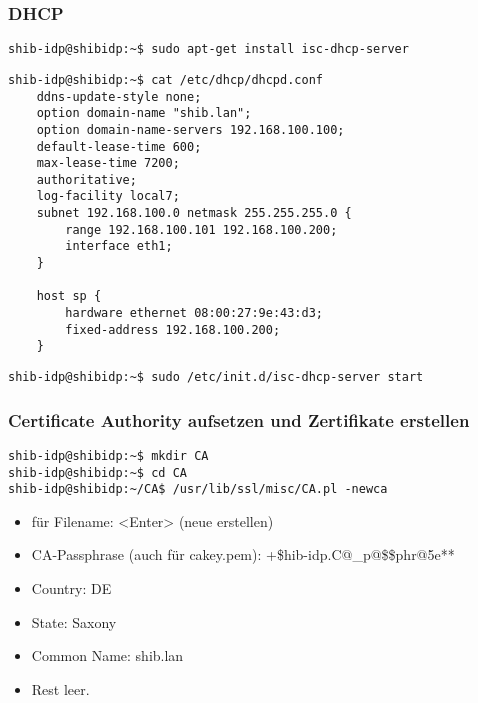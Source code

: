 \subsubsection{DHCP}
\begin{lstlisting}
shib-idp@shibidp:~$ sudo apt-get install isc-dhcp-server
\end{lstlisting}
\begin{lstlisting}
shib-idp@shibidp:~$ cat /etc/dhcp/dhcpd.conf 
	ddns-update-style none;
	option domain-name "shib.lan";
	option domain-name-servers 192.168.100.100;
	default-lease-time 600;
	max-lease-time 7200;
	authoritative;
	log-facility local7;
	subnet 192.168.100.0 netmask 255.255.255.0 {
		range 192.168.100.101 192.168.100.200;
		interface eth1;
	}

	host sp {
		hardware ethernet 08:00:27:9e:43:d3;
		fixed-address 192.168.100.200;
	}
\end{lstlisting}

\begin{lstlisting}
shib-idp@shibidp:~$ sudo /etc/init.d/isc-dhcp-server start
\end{lstlisting}
\subsubsection{Certificate Authority aufsetzen und Zertifikate erstellen}
\begin{lstlisting}
shib-idp@shibidp:~$ mkdir CA
shib-idp@shibidp:~$ cd CA
shib-idp@shibidp:~/CA$ /usr/lib/ssl/misc/CA.pl -newca
\end{lstlisting}
\begin{itemize}
 \item für Filename: <Enter> (neue erstellen)
 \item CA-Passphrase (auch für cakey.pem): +\$hib-idp.C@\_p@\$\$phr@5e**
 \item Country: DE
 \item State: Saxony
 \item Common Name: shib.lan
 \item Rest leer.
\end{itemize}
			
